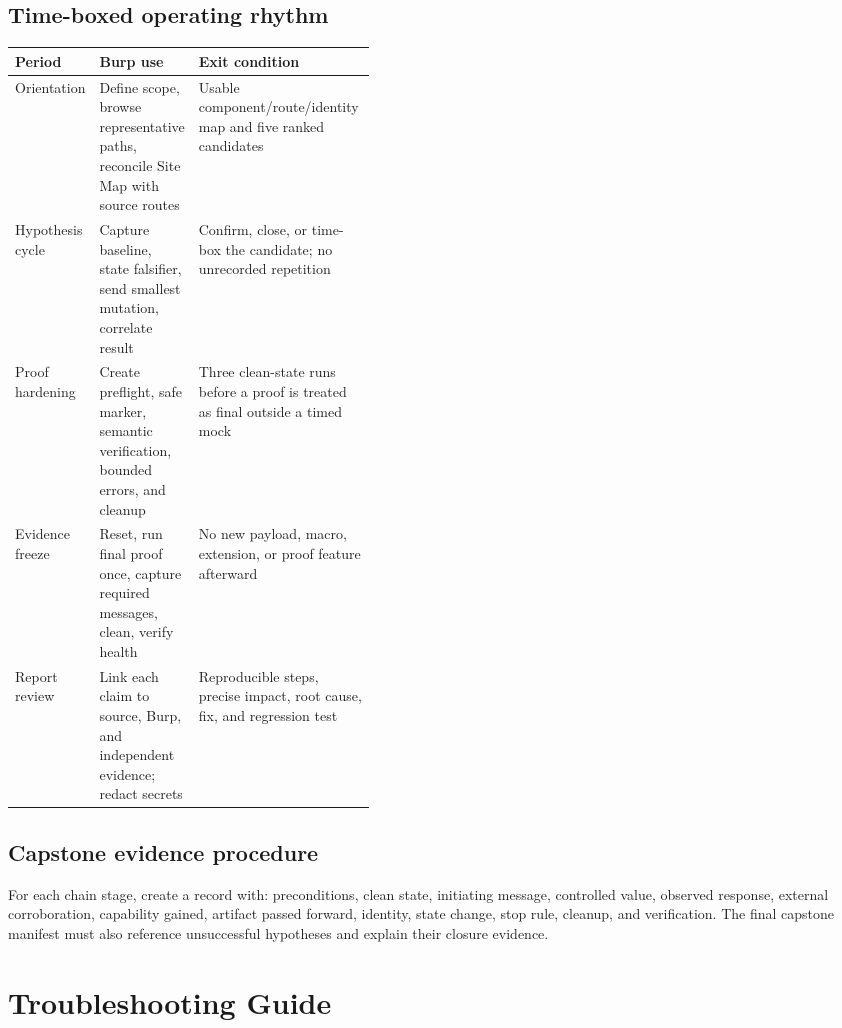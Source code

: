 \documentclass[11pt]{article}
\begin{document}
\subsection{Time-boxed operating rhythm}

\begin{tabularx}{\linewidth}{@{}L{0.20\linewidth}L{0.22\linewidth}Y@{}}
\toprule
\textbf{Period} & \textbf{Burp use} & \textbf{Exit condition} \\
\midrule
Orientation & Define scope, browse representative paths, reconcile Site Map with source routes & Usable component/route/identity map and five ranked candidates \\
Hypothesis cycle & Capture baseline, state falsifier, send smallest mutation, correlate result & Confirm, close, or time-box the candidate; no unrecorded repetition \\
Proof hardening & Create preflight, safe marker, semantic verification, bounded errors, and cleanup & Three clean-state runs before a proof is treated as final outside a timed mock \\
Evidence freeze & Reset, run final proof once, capture required messages, clean, verify health & No new payload, macro, extension, or proof feature afterward \\
Report review & Link each claim to source, Burp, and independent evidence; redact secrets & Reproducible steps, precise impact, root cause, fix, and regression test \\
\bottomrule
\end{tabularx}

\subsection{Capstone evidence procedure}

For each chain stage, create a record with: preconditions, clean state, initiating
message, controlled value, observed response, external corroboration, capability
gained, artifact passed forward, identity, state change, stop rule, cleanup, and
verification. The final capstone manifest must also reference unsuccessful
hypotheses and explain their closure evidence.

\section{Troubleshooting Guide}
\end{document}
